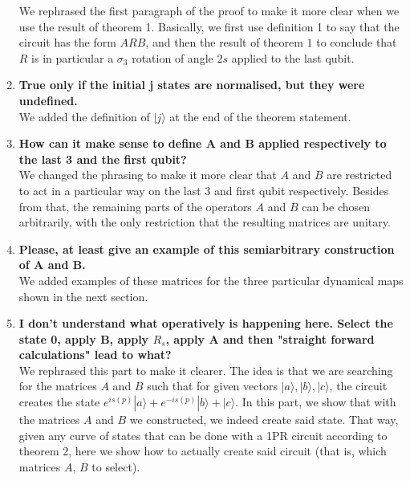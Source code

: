 \documentclass[10pt,letterpaper]{article} %
\begin{document}
\begin{enumerate}
We rephrased the first paragraph of the proof to make it more clear when we use the result of theorem 1. 
Basically, we first use definition 1 to say that the circuit has the form $ARB$,
and then the result of theorem $1$
to conclude that $R$ is in particular a $\sigma_3$ rotation
of angle $2s$ applied to the last qubit.\\


\item \textbf{True only if the initial j states are normalised, but they were undefined.}\\

We added the definition of $|j\rangle$  at the end of the theorem statement.\\


\item \textbf{How can it make sense to define A and B applied respectively to the last 3 and the first qubit?}\\

We changed the phrasing to make it more clear that $A$ and $B$ 
are restricted to act in a particular way on the last 3 and first qubit respectively.
Besides from that, the remaining parts of the operators $A$ and $B$ can be chosen arbitrarily, 
with the only restriction that the resulting matrices are unitary. \\

\item  \textbf{Please, at least give an example of this semiarbitrary construction of A and B.}\\

We added examples of these matrices for the three particular dynamical maps shown in the next section. \\

\item \textbf{I don't understand what operatively is happening here. Select the state 0, apply B, apply $R_s$, apply A and then "straight forward calculations" lead to what?} \\

We rephrased this part to make it clearer. The idea is that we are searching for the matrices $A$ and $B$ such
that for given vectors $|a\rangle, |b\rangle, |c\rangle$, the circuit creates
the state $e^{is(p)} |a \rangle + e^{-is(p)} |b \rangle + |c\rangle$.
In this part, we show that with the matrices $A$ and $B$ we constructed,
we indeed create said state.
That way, given any curve of states that can be done with a 1PR circuit
according to theorem 2, here we show how
to actually create said circuit (that is, which matrices $A$, $B$ to select).\\


\end{enumerate}
\end{document}
